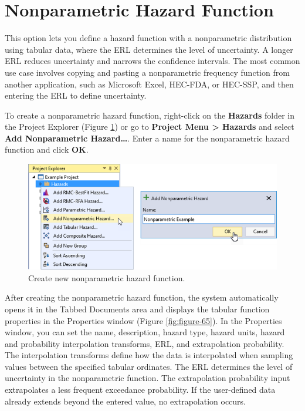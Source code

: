 \documentclass[
]{book}
\begin{document}
\hypertarget{nonparametric-hazard-function}{%
\section{Nonparametric Hazard Function}\label{nonparametric-hazard-function}}

This option lets you define a hazard function with a nonparametric distribution using tabular data, where the ERL determines the level of uncertainty. A longer ERL reduces uncertainty and narrows the confidence intervals. The most common use case involves copying and pasting a nonparametric frequency function from another application, such as Microsoft Excel, HEC-FDA, or HEC-SSP, and then entering the ERL to define uncertainty.

To create a nonparametric hazard function, right-click on the \textbf{Hazards} folder in the Project Explorer (Figure \ref{fig:figure-64}) or go to \textbf{Project Menu \textgreater{} Hazards} and select \textbf{Add Nonparametric Hazard\ldots{}}. Enter a name for the nonparametric hazard function and click \textbf{OK}.

\begin{figure}

{\centering \includegraphics{images/figure64} 

}

\caption{Create new nonparametric hazard function.}\label{fig:figure-64}
\end{figure}

After creating the nonparametric hazard function, the system automatically opens it in the Tabbed Documents area and displays the tabular function properties in the Properties window (Figure \ref{fig:figure-65}). In the Properties window, you can set the name, description, hazard type, hazard units, hazard and probability interpolation transforms, ERL, and extrapolation probability. The interpolation transforms define how the data is interpolated when sampling values between the specified tabular ordinates. The ERL determines the level of uncertainty in the nonparametric function. The extrapolation probability input extrapolates a less frequent exceedance probability. If the user-defined data already extends beyond the entered value, no extrapolation occurs.
\end{document}
